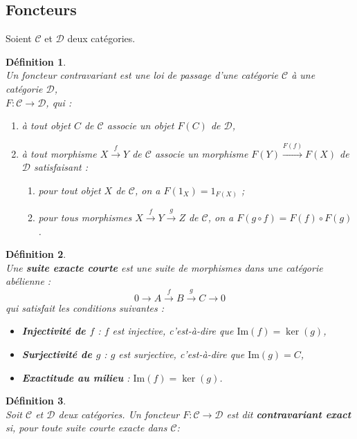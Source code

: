 \documentclass[a4paper, 14pt]{report}
\newtheorem{definition}{Définition}[section]
\begin{document}
\begin{onehalfspace}
{			\subsection{Foncteurs}
			Soient $\mathcal{C}$ et $\mathcal{D}$ deux catégories.
			\begin{definition} \cite{maclane1971categories} \\
				Un \textit{foncteur contravariant} est une loi de passage d'une catégorie $\mathcal{C}$ à une catégorie $\mathcal{D}$, \\
				$F : \mathcal{C} \to \mathcal{D}$, qui :
				\begin{enumerate} [label=\roman*)]
					\item à tout objet $C$ de $\mathcal{C}$ associe un objet $F(C)$ de $\mathcal{D}$,
					\item à tout morphisme $X \xrightarrow{f} Y$ de $\mathcal{C}$ associe un morphisme $F(Y) \xrightarrow{F(f)} F(X)$ de $\mathcal{D}$ satisfaisant :
					\begin{enumerate}
						\item pour tout objet $X$ de $\mathcal{C}$, on a $F(1_X) = 1_{F(X)}$ ;
						\item pour tous morphismes $X \xrightarrow{f} Y \xrightarrow{g} Z$ de $\mathcal{C}$, on a $F(g \circ f) = F(f) \circ F(g)$.
					\end{enumerate}
				\end{enumerate}
			\end{definition}
			
			\begin{definition}  \cite{cartan1999homological}\\
				Une \textbf{suite exacte courte} est une suite de morphismes dans une catégorie abélienne :
				\[
				0 \to A \xrightarrow{f} B \xrightarrow{g} C \to 0
				\]
				qui satisfait les conditions suivantes :
				\begin{itemize}
					\item \textbf{Injectivité de \( f \)} : \( f \) est injective, c'est-à-dire que \( \text{Im}(f) = \ker(g) \),
					\item \textbf{Surjectivité de \( g \)} : \( g \) est surjective, c'est-à-dire que \( \text{Im}(g) = C \),
					\item \textbf{Exactitude au milieu} : \( \text{Im}(f) = \ker(g) \).
				\end{itemize}
			\end{definition}
			
			\begin{definition} \cite{cartan1999homological}\\
				Soit \( \mathcal{C} \) et \( \mathcal{D} \) deux catégories. Un foncteur \( F : \mathcal{C} \to \mathcal{D} \) est dit \textbf{contravariant exact} si, pour toute suite courte exacte dans \( \mathcal{C} \):
				

\end{definition}}
\end{onehalfspace}
\end{document}
